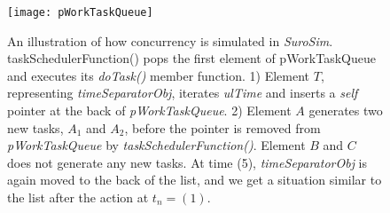 \begin{figure}[htb!p]
	\centering
	\texttt{[image: pWorkTaskQueue]}
	\caption[A schematic model of time propagation in \emph{auroSim}]{
			An illustration of how concurrency is simulated in \emph{SuroSim}.
			taskSchedulerFunction() pops the first element of pWorkTaskQueue and executes its \emph{doTask()} member function.
			1) Element $T$, representing \emph{timeSeparatorObj}, iterates \emph{ulTime} and inserts a \emph{self} pointer at the back of \emph{pWorkTaskQueue}.
			2) Element $A$ generates two new tasks, $A_1$ and $A_2$, before the pointer is removed from \emph{pWorkTaskQueue} by \emph{taskSchedulerFunction()}.
			Element $B$ and $C$ does not generate any new tasks.
			At time (5), \emph{timeSeparatorObj} is again moved to the back of the list, and we get a situation similar to the list after the action at $t_n=(1)$. 
			}
	\label{figTimePropagationbypWorkTaskQueue}
\end{figure}

